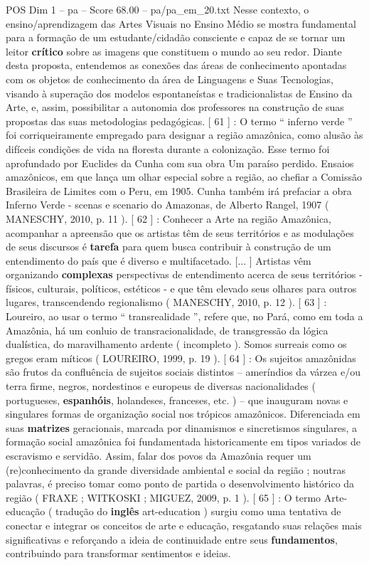 \begin{textsample}{POS Dim 1 – pa – Score 68.00 – pa/pa\_em\_20.txt}
Nesse contexto, o ensino/aprendizagem das Artes Visuais no Ensino Médio se mostra fundamental para a formação de um estudante/cidadão consciente e capaz de se tornar um leitor \textbf{crítico} sobre as imagens que constituem o mundo ao seu redor.
Diante desta proposta, entendemos as conexões das áreas de conhecimento apontadas com os objetos de conhecimento da área de Linguagens e Suas Tecnologias, visando à superação dos modelos espontaneístas e tradicionalistas de Ensino da Arte, e, assim, possibilitar a autonomia dos professores na construção de suas propostas das suas metodologias pedagógicas. [ 61 ] : O termo “ inferno verde ” foi corriqueiramente empregado para designar a região amazônica, como alusão às difíceis condições de vida na floresta durante a colonização.
Esse termo foi aprofundado por Euclides da Cunha com sua obra Um paraíso perdido.
Ensaios amazônicos, em que lança um olhar especial sobre a região, ao chefiar a Comissão Brasileira de Limites com o Peru, em 1905.
Cunha também irá prefaciar a obra Inferno Verde - scenas e scenario do Amazonas, de Alberto Rangel, 1907 ( MANESCHY, 2010, p. 11 ). [ 62 ] : Conhecer a Arte na região Amazônica, acompanhar a apreensão que os artistas têm de seus territórios e as modulações de seus discursos é \textbf{tarefa} para quem busca contribuir à construção de um entendimento do país que é diverso e multifacetado. [... ] Artistas vêm organizando \textbf{complexas} perspectivas de entendimento acerca de seus territórios - físicos, culturais, políticos, estéticos - e que têm elevado seus olhares para outros lugares, transcendendo regionalismo ( MANESCHY, 2010, p. 12 ). [ 63 ] : Loureiro, ao usar o termo “ transrealidade ”, refere que, no Pará, como em toda a Amazônia, há um conluio de transracionalidade, de transgressão da lógica dualística, do maravilhamento ardente ( incompleto ).
Somos surreais como os gregos eram míticos ( LOUREIRO, 1999, p. 19 ). [ 64 ] : Os sujeitos amazônidas são frutos da confluência de sujeitos sociais distintos – ameríndios da várzea e/ou terra firme, negros, nordestinos e europeus de diversas nacionalidades ( portugueses, \textbf{espanhóis}, holandeses, franceses, etc. ) – que inauguram novas e singulares formas de organização social nos trópicos amazônicos.
Diferenciada em suas \textbf{matrizes} geracionais, marcada por dinamismos e sincretismos singulares, a formação social amazônica foi fundamentada historicamente em tipos variados de escravismo e servidão.
Assim, falar dos povos da Amazônia requer um (re)conhecimento da grande diversidade ambiental e social da região ; noutras palavras, é preciso tomar como ponto de partida o desenvolvimento histórico da região ( FRAXE ; WITKOSKI ; MIGUEZ, 2009, p. 1 ). [ 65 ] : O termo Arte-educação ( tradução do \textbf{inglês} art-education ) surgiu como uma tentativa de conectar e integrar os conceitos de arte e educação, resgatando suas relações mais significativas e reforçando a ideia de continuidade entre seus \textbf{fundamentos}, contribuindo para transformar sentimentos e ideias.

\end{textsample}
